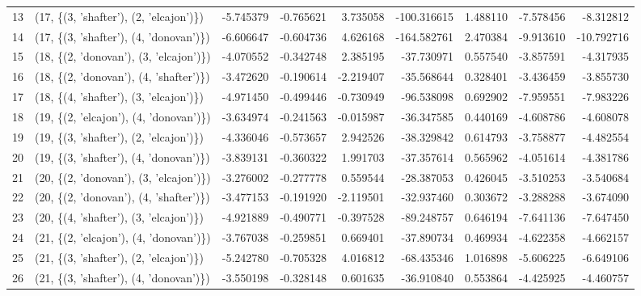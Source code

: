 \begin{tabular}{llrrrrrrr}
13 &  (17, \{(3, 'shafter'), (2, 'elcajon')\}) & -5.745379 &  -0.765621 &  3.735058 & -100.316615 &  1.488110 &  -7.578456 &  -8.312812 \\
14 &  (17, \{(3, 'shafter'), (4, 'donovan')\}) & -6.606647 &  -0.604736 &  4.626168 & -164.582761 &  2.470384 &  -9.913610 & -10.792716 \\
15 &  (18, \{(2, 'donovan'), (3, 'elcajon')\}) & -4.070552 &  -0.342748 &  2.385195 &  -37.730971 &  0.557540 &  -3.857591 &  -4.317935 \\
16 &  (18, \{(2, 'donovan'), (4, 'shafter')\}) & -3.472620 &  -0.190614 & -2.219407 &  -35.568644 &  0.328401 &  -3.436459 &  -3.855730 \\
17 &  (18, \{(4, 'shafter'), (3, 'elcajon')\}) & -4.971450 &  -0.499446 & -0.730949 &  -96.538098 &  0.692902 &  -7.959551 &  -7.983226 \\
18 &  (19, \{(2, 'elcajon'), (4, 'donovan')\}) & -3.634974 &  -0.241563 & -0.015987 &  -36.347585 &  0.440169 &  -4.608786 &  -4.608078 \\
19 &  (19, \{(3, 'shafter'), (2, 'elcajon')\}) & -4.336046 &  -0.573657 &  2.942526 &  -38.329842 &  0.614793 &  -3.758877 &  -4.482554 \\
20 &  (19, \{(3, 'shafter'), (4, 'donovan')\}) & -3.839131 &  -0.360322 &  1.991703 &  -37.357614 &  0.565962 &  -4.051614 &  -4.381786 \\
21 &  (20, \{(2, 'donovan'), (3, 'elcajon')\}) & -3.276002 &  -0.277778 &  0.559544 &  -28.387053 &  0.426045 &  -3.510253 &  -3.540684 \\
22 &  (20, \{(2, 'donovan'), (4, 'shafter')\}) & -3.477153 &  -0.191920 & -2.119501 &  -32.937460 &  0.303672 &  -3.288288 &  -3.674090 \\
23 &  (20, \{(4, 'shafter'), (3, 'elcajon')\}) & -4.921889 &  -0.490771 & -0.397528 &  -89.248757 &  0.646194 &  -7.641136 &  -7.647450 \\
24 &  (21, \{(2, 'elcajon'), (4, 'donovan')\}) & -3.767038 &  -0.259851 &  0.669401 &  -37.890734 &  0.469934 &  -4.622358 &  -4.662157 \\
25 &  (21, \{(3, 'shafter'), (2, 'elcajon')\}) & -5.242780 &  -0.705328 &  4.016812 &  -68.435346 &  1.016898 &  -5.606225 &  -6.649106 \\
26 &  (21, \{(3, 'shafter'), (4, 'donovan')\}) & -3.550198 &  -0.328148 &  0.601635 &  -36.910840 &  0.553864 &  -4.425925 &  -4.460757 \\
\bottomrule
\end{tabular}

